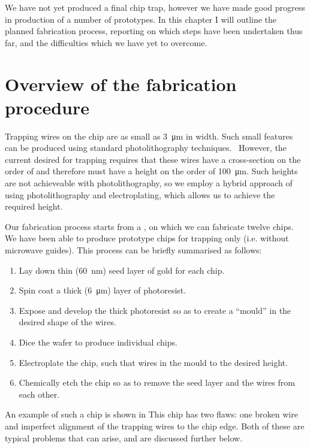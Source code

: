 We have not yet produced a final chip trap, however we have made good progress
in production of a number of prototypes. In this chapter I will outline the
planned fabrication process, reporting on which steps have been undertaken thus
far, and the difficulties which we have yet to overcome.

\section{Overview of the fabrication procedure}

Trapping wires on the chip are as small as \SI{3}{\micro\meter} in width. Such
small features can be produced using standard photolithography
techniques.~\cite{} However, the current desired for trapping requires that
these wires have a cross-section on the order of  and therefore must
have a height on the order of \SI{100}{\micro\meter}. Such heights are not
achieveable with photolithography, so we employ a hybrid approach of using
photolithography and electroplating, which allows us to achieve the required
height.

Our fabrication process starts from a , on which we can fabricate twelve  chips. We have been
able to produce prototype chips for trapping only (i.e. without microwave
guides). This process can be briefly summarised as follows:
\begin{enumerate}
\item Lay down thin (\SI{60}{\nano\meter}) seed layer of gold for each chip.
\item Spin coat a thick (\SI{6}{\micro\meter}) layer of photoresist.
\item Expose and develop the thick photoresist so as to create a ``mould''
in the desired shape of the wires.
\item Dice the wafer to produce individual chips.
\item Electroplate the chip, such that wires  in the mould to the
desired height.
\item Chemically etch the chip so as to remove the seed layer and
   the wires from each other.
\end{enumerate}

An example of such a chip is shown in  This chip has two flaws: one broken wire
 and imperfect alignment of the trapping wires
to the chip edge. Both of these are typical problems that can arise, and are
discussed further below.

